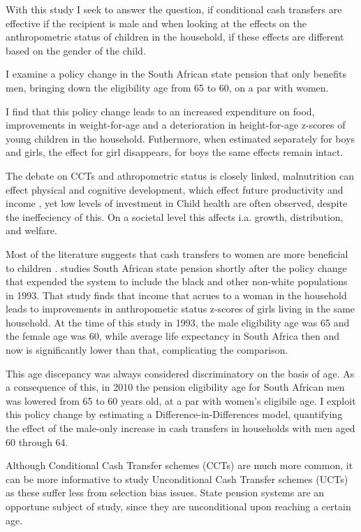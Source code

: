 \documentclass[a4paper,british]{article}\usepackage[]{graphicx}\usepackage[]{color}
\begin{document}
With this study I seek to answer the question, if conditional cash
transfers are effective if the recipient is male and when looking
at the effects on the anthropometric status of children in the household,
if these effects are different based on the gender of the child.

I examine a policy change in the South African state pension that
only benefits men, bringing down the eligibility age from 65 to 60,
on a par with women.

I find that this policy change leads to an increased expenditure on
food, improvements in weight-for-age and a deterioration in height-for-age
z-scores of young children in the household. Futhermore, when estimated
separately for boys and girls, the effect for girl disappears, for
boys the same effects remain intact.

The debate on CCTs and athropometric status is closely linked, malnutrition
can effect physical and cognitive development, which effect future
productivity and income , yet low levels of investment in Child health
are often observed, despite the ineffeciency of this. On a societal
level this affects i.a. growth, distribution, and welfare.

Most of the literature suggests that cash transfers to women are more
beneficial to children \citep{thomas1994like} . \citet{duflo2000child,duflo2003grandmothers}
studies South African state pension shortly after the policy change
that expended the system to include the black and other non-white
populations in 1993. That study finds that income that acrues to a
woman in the household leads to improvements in anthropometic status
z-scores of girls living in the same household. At the time of this
study in 1993, the male eligibility age was 65 and the female age
was 60, while average life expectancy in South Africa then and now
is significantly lower than that, complicating the comparison. 

This age discepancy was always considered discriminatory on the basis
of age. As a consequence of this, in 2010 the pension eligibility
age for South African men was lowered from 65 to 60 years old, at
a par with women's eligibile age. I exploit this policy change by
estimating a Difference-in-Differences model, quantifying the effect
of the male-only increase in cash transfers in households with men
aged 60 through 64.

Although Conditional Cash Transfer schemes (CCTs) are much more common,
it can be more informative to study Unconditional Cash Transfer schemes
(UCTs) as these suffer less from selection bias issues. State pension
systems are an opportune subject of study, since they are unconditional
upon reaching a certain age. 
\end{document}
